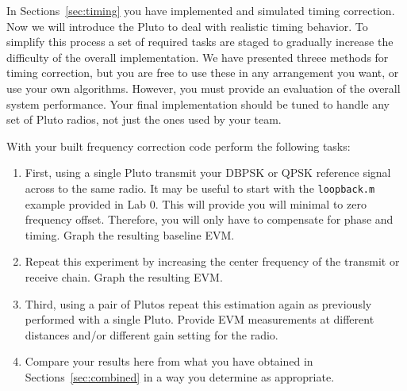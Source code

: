 \documentclass[letterpaper,12pt]{article}
\begin{document}
In Sections~\ref{sec:timing} you have implemented and simulated timing correction.  
Now we will introduce the Pluto to deal with realistic timing behavior.  To simplify this process a set of required tasks are staged to gradually increase the difficulty of the overall implementation.  We have presented threee methods for timing correction, but you are free to use these in any arrangement you want, or use your own algorithms.  However, you must 
provide an evaluation of the overall system performance.  Your final implementation should be tuned to handle 
any set of Pluto radios, not just the ones used by your team.\par
%
With your built frequency correction code perform the following tasks:
%
\begin{enumerate}
 \item First, using a single Pluto transmit your DBPSK or QPSK reference signal across to the same radio.  It may be useful to start with the \texttt{loopback.m} example provided in Lab 0.  This will provide you will minimal to zero frequency offset.  Therefore, you will only have to compensate for phase and timing.  Graph the resulting baseline EVM.
\item Repeat this experiment by increasing the center frequency of the transmit or receive chain.  Graph the resulting EVM.
  \item Third, using a pair of Plutos repeat this estimation again as previously performed with a single 
Pluto.  Provide EVM measurements at different distances and/or different gain setting for the radio.
  \item Compare your results here from what you have obtained in Sections~\ref{sec:combined} in a way you determine as appropriate.
\end{enumerate}
%
\end{document}
